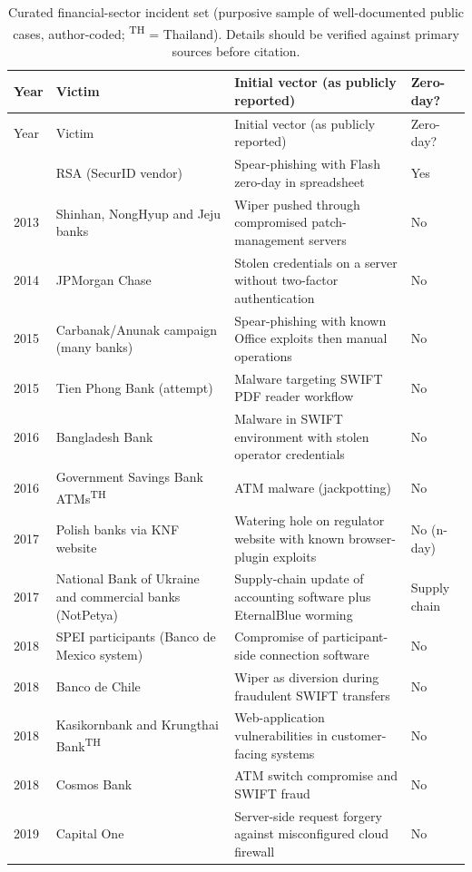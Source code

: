 \begin{longtable}{p{}p{}p{}p{}}
\caption{Curated financial-sector incident set (purposive sample of well-documented public cases, author-coded; \textsuperscript{TH} = Thailand). Details should be verified against primary sources before citation.}\label{tab:incidents}\\
\toprule
Year & Victim & Initial vector (as publicly reported) & Zero-day? \\
\midrule
\endfirsthead
\toprule
Year & Victim & Initial vector (as publicly reported) & Zero-day? \\
\midrule
\endhead
\bottomrule
\endfoot
2011 & RSA (SecurID vendor) & Spear-phishing with Flash zero-day in spreadsheet & Yes \\
2013 & Shinhan, NongHyup and Jeju banks & Wiper pushed through compromised patch-management servers & No \\
2014 & JPMorgan Chase & Stolen credentials on a server without two-factor authentication & No \\
2015 & Carbanak/Anunak campaign (many banks) & Spear-phishing with known Office exploits then manual operations & No \\
2015 & Tien Phong Bank (attempt) & Malware targeting SWIFT PDF reader workflow & No \\
2016 & Bangladesh Bank & Malware in SWIFT environment with stolen operator credentials & No \\
2016 & Government Savings Bank ATMs\textsuperscript{TH} & ATM malware (jackpotting) & No \\
2017 & Polish banks via KNF website & Watering hole on regulator website with known browser-plugin exploits & No (n-day) \\
2017 & National Bank of Ukraine and commercial banks (NotPetya) & Supply-chain update of accounting software plus EternalBlue worming & Supply chain \\
2018 & SPEI participants (Banco de Mexico system) & Compromise of participant-side connection software & No \\
2018 & Banco de Chile & Wiper as diversion during fraudulent SWIFT transfers & No \\
2018 & Kasikornbank and Krungthai Bank\textsuperscript{TH} & Web-application vulnerabilities in customer-facing systems & No \\
2018 & Cosmos Bank & ATM switch compromise and SWIFT fraud & No \\
2019 & Capital One & Server-side request forgery against misconfigured cloud firewall & No \\

\end{longtable}
